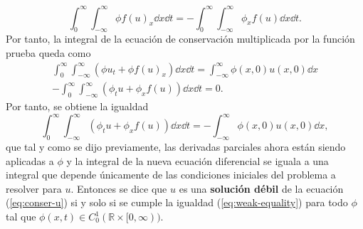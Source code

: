 \begin{equation}
	\int_{0}^{\infty}\int_{-\infty}^{\infty}  \phi f(u)_x \dd{x}\dd{t} =  -\int_{0}^{\infty}\int_{-\infty}^{\infty} \phi_x f(u) \dd{x}\dd{t}.
\end{equation}
Por tanto, la integral de la ecuación de conservación multiplicada por la función prueba queda como
\begin{equation}
\begin{aligned}
	\int_{0}^{\infty}\int_{-\infty}^{\infty}\left(\phi u_t + \phi f(u)_x\right) \dd{x}\dd{t} = \int_{-\infty}^{\infty} \phi(x,0)u(x,0) \dd{x} \\
	-\int_{0}^{\infty}\int_{-\infty}^{\infty}\left(\phi_t u + \phi_x f(u)\right) \dd{x}\dd{t} = 0.
\end{aligned}
\end{equation}
Por tanto, se obtiene la igualdad
\begin{equation}
	\int_{0}^{\infty}\int_{-\infty}^{\infty}\left(\phi_t u + \phi_x f(u)\right) \dd{x}\dd{t} = -\int_{-\infty}^{\infty} \phi(x,0)u(x,0) \dd{x},
	\label{eq:weak-equality}
\end{equation}
que tal y como se dijo previamente, las derivadas parciales ahora están siendo aplicadas a $\phi$ y la integral de la nueva ecuación diferencial se iguala a una integral que depende únicamente de las condiciones iniciales del problema a resolver para $u$. Entonces se dice que $u$ es una \textbf{solución débil} de la ecuación (\ref{eq:conser-u}) si y solo si se cumple la igualdad (\ref{eq:weak-equality}) para todo $\phi$ tal que $\phi(x,t) \in C_{0}^{1} (\mathbb{R} \times [0, \infty))$.


